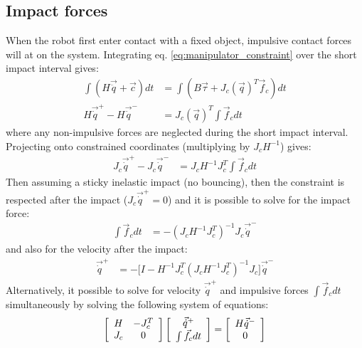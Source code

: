 \subsection{Impact forces}
\label{sec:impact}
%
When the robot first enter contact with a fixed object, impulsive contact forces will at on the system. Integrating eq. \eqref{eq:manipulator_constraint} over the short impact interval gives:
%
\begin{align}
\int{ ( H \vec{\ddot{q}} + \vec{c} ) dt } &= \int{ ( B \vec{\tau} + J_c( \vec{ q } )^T  \vec{f}_c ) dt } \\
H \vec{\dot{q}}^+ - H \vec{\dot{q}}^- &= J_c( \vec{ q } )^T  \int{  \vec{f}_c dt }
\label{eq:manipulator_impact}
\end{align}
%
where any non-impulsive forces are neglected during the short impact interval. Projecting onto constrained coordinates (multiplying by $J_c H^{-1}$) gives:
%
\begin{align}
J_c \vec{\dot{q}}^+ - J_c \vec{\dot{q}}^- &= J_c H^{-1} J_c^T  \int{  \vec{f}_c dt }
\label{eq:manipulator_impact2}
\end{align}
%
Then assuming a sticky inelastic impact (no bouncing), then the constraint is respected after the impact ($J_c \vec{\dot{q}}^+=0$) and it is possible to solve for the impact force:
%
\begin{align}
\int{  \vec{f}_c dt } &= - \left( J_c H^{-1} J_c^T \right)^{-1}  J_c \vec{\dot{q}}^-
\label{eq:manipulator_impact_force}
\end{align}
%
and also for the velocity after the impact:
%
\begin{align}
\vec{\dot{q}}^+ &= - \Big[ I - H^{-1} J_c^T \left( J_c H^{-1} J_c^T \right)^{-1} J_c \Big] \vec{\dot{q}}^-
\label{eq:manipulator_impact_velocity}
\end{align}
%
Alternatively, it possible to solve for velocity $\vec{\dot{q}}^+$ and impulsive forces $\int{ \vec{f}_c dt }$ simultaneously by solving the following system of equations:
%
\begin{align}
\left[ \begin{array}{c c } 	H & -J_c^T  \\ J_c 	& 0  	\end{array} \right] \left[ \begin{array}{c} \vec{\dot{q}}^+  \\ \int{ \vec{f}_c dt }\end{array} \right] = \left[ \begin{array}{c}  	H \vec{\dot{q}}^-   \\ 0  \end{array} \right]
\label{eq:manipulator_impact_eom}
\end{align}



